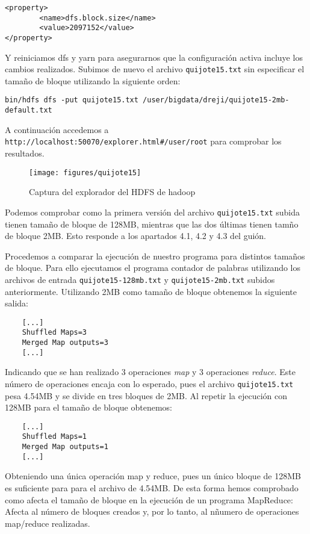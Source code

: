 \documentclass[11pt]{article}
\def\inline{\lstinline[basicstyle=\ttfamily,keywordstyle={}]}
\begin{document}
\begin{verbatim}
<property>
        <name>dfs.block.size</name>
        <value>2097152</value>
</property>
\end{verbatim}

Y reiniciamos dfs y yarn para asegurarnos que la configuración activa incluye los cambios realizados. Subimos de nuevo el archivo \inline{quijote15.txt} sin especificar el tamaño de bloque utilizando la siguiente orden:

\begin{verbatim}
bin/hdfs dfs -put quijote15.txt /user/bigdata/dreji/quijote15-2mb-default.txt
\end{verbatim}

A continuación accedemos a \inline{http://localhost:50070/explorer.html#/user/root} para comprobar los resultados.

\begin{figure}[H]
  \centering
  \texttt{[image: figures/quijote15]}
  \caption{Captura del explorador del HDFS de hadoop}
\end{figure}

Podemos comprobar como la primera versión del archivo \inline{quijote15.txt} subida tienen tamaño de bloque de 128MB, mientras que las dos últimas tienen tamño de bloque 2MB. Esto responde a los apartados 4.1, 4.2 y 4.3 del guión.

Procedemos a comparar la ejecución de nuestro programa para distintos tamaños de bloque. Para ello ejecutamos el programa contador de palabras utilizando los archivos de entrada \inline{quijote15-128mb.txt} y \inline{quijote15-2mb.txt} subidos anteriormente. Utilizando 2MB como tamaño de bloque obtenemos la siguiente salida:

\begin{verbatim}
	[...]
	Shuffled Maps=3
	Merged Map outputs=3
	[...]
\end{verbatim}

Indicando que se han realizado 3 operaciones \emph{map} y 3 operaciones \emph{reduce}. Este número de operaciones encaja con lo esperado, pues el archivo \inline{quijote15.txt} pesa 4.54MB y se divide en tres bloques de 2MB. Al repetir la ejecución con 128MB para el tamaño de bloque obtenemos:

\begin{verbatim}
	[...]
	Shuffled Maps=1
	Merged Map outputs=1
	[...]
\end{verbatim}

Obteniendo una única operación map y reduce, pues un único bloque de 128MB es suficiente para para el archivo de 4.54MB. De esta forma hemos comprobado como afecta el tamaño de bloque en la ejecución de un programa MapReduce: Afecta al número de bloques creados y, por lo tanto, al nñumero de operaciones map/reduce realizadas.
\end{document}

